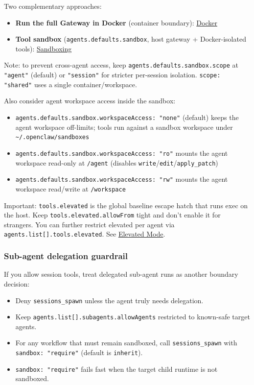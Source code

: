 Two complementary approaches:

\begin{itemize}
  \item \textbf{Run the full Gateway in Docker} (container boundary): \href{/install/docker}{Docker}
  \item \textbf{Tool sandbox} (\texttt{agents.defaults.sandbox}, host gateway + Docker-isolated tools): \href{/gateway/sandboxing}{Sandboxing}
\end{itemize}


Note: to prevent cross-agent access, keep \texttt{agents.defaults.sandbox.scope} at \texttt{"agent"} (default)
or \texttt{"session"} for stricter per-session isolation. \texttt{scope: "shared"} uses a
single container/workspace.

Also consider agent workspace access inside the sandbox:

\begin{itemize}
  \item \texttt{agents.defaults.sandbox.workspaceAccess: "none"} (default) keeps the agent workspace off-limits; tools run against a sandbox workspace under \texttt{\textasciitilde{}/.openclaw/sandboxes}
  \item \texttt{agents.defaults.sandbox.workspaceAccess: "ro"} mounts the agent workspace read-only at \texttt{/agent} (disables \texttt{write}/\texttt{edit}/\texttt{apply\_patch})
  \item \texttt{agents.defaults.sandbox.workspaceAccess: "rw"} mounts the agent workspace read/write at \texttt{/workspace}
\end{itemize}


Important: \texttt{tools.elevated} is the global baseline escape hatch that runs exec on the host. Keep \texttt{tools.elevated.allowFrom} tight and don’t enable it for strangers. You can further restrict elevated per agent via \texttt{agents.list[].tools.elevated}. See \href{/tools/elevated}{Elevated Mode}.

\subsubsection{Sub-agent delegation guardrail}


If you allow session tools, treat delegated sub-agent runs as another boundary decision:

\begin{itemize}
  \item Deny \texttt{sessions\_spawn} unless the agent truly needs delegation.
  \item Keep \texttt{agents.list[].subagents.allowAgents} restricted to known-safe target agents.
  \item For any workflow that must remain sandboxed, call \texttt{sessions\_spawn} with \texttt{sandbox: "require"} (default is \texttt{inherit}).
  \item \texttt{sandbox: "require"} fails fast when the target child runtime is not sandboxed.
\end{itemize}



